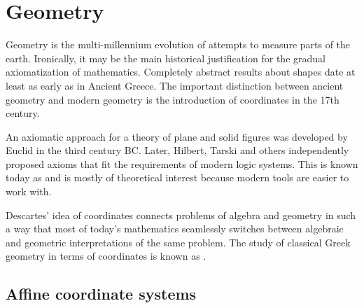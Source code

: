\section{Geometry}\label{sec:geometry}

\begin{Remark}\label{def:coordinates_in_geometry}
  Geometry is the multi-millennium evolution of attempts to measure parts of the earth. Ironically, it may be the main historical justification for the gradual axiomatization of mathematics. Completely abstract results about shapes date at least as early as in Ancient Greece. The important distinction between ancient geometry and modern geometry is the introduction of coordinates in the 17th century.

  An axiomatic approach for a theory of plane and solid figures was developed by Euclid in the third century BC. Later, Hilbert, Tarski and others independently proposed axioms that fit the requirements of modern logic systems. This is known today as  and is mostly of theoretical interest because modern tools are easier to work with.

  Descartes' idea of coordinates connects problems of algebra and geometry in such a way that most of today's mathematics seamlessly switches between algebraic and geometric interpretations of the same problem. The study of classical Greek geometry in terms of coordinates is known as .
\end{Remark}

\subsection{Affine coordinate systems}\label{subsec:affine_coordinate_system}


